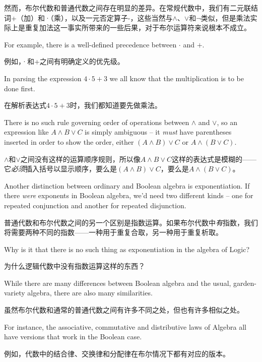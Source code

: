 然而，布尔代数和普通代数之间存在明显的差异。在常规代数中，我们有二元联结词+（加）和·（乘），以及一元否定算子-，这些当然与$\land$、$\lor$和$\lnot$类似，但是乘法实际上是重复加法这一事实所带来的一些后果，对于布尔运算符来说根本不成立。

For example, there is a well-defined precedence between $\cdot$ and
$+$.

例如，·和+之间有明确定义的优先级。

In parsing the expression $4 \cdot 5 + 3$ we all know that the 
multiplication is to be done first.

在解析表达式$4 \cdot 5 + 3$时，我们都知道要先做乘法。

There is no such rule governing
order of operations between $\land$ and $\lor$, so an expression like
$A \land B \lor C$ is simply ambiguous -- it {\em must} have parentheses
inserted in order to show the order, either  $(A \land B) \lor C$ or 
$A \land (B \lor C)$.

$\land$和$\lor$之间没有这样的运算顺序规则，所以像$A \land B \lor C$这样的表达式是模糊的——它{\em 必须}插入括号以显示顺序，要么是$(A \land B) \lor C$，要么是$A \land (B \lor C)$。

Another distinction between ordinary and Boolean
algebra is exponentiation.  If there {\em were} exponents in Boolean algebra,
we'd need two different kinds -- one for repeated conjunction and another
for repeated disjunction.

普通代数和布尔代数之间的另一个区别是指数运算。如果布尔代数中{\em 有}指数，我们将需要两种不同的指数——一种用于重复合取，另一种用于重复析取。

\begin{exer} 
Why is it that there is no such thing as exponentiation
in the algebra of Logic?

为什么逻辑代数中没有指数运算这样的东西？
\end{exer}

While there are many differences between Boolean algebra and the
usual, garden-variety algebra, there are also many similarities.

虽然布尔代数和通常的普通代数之间有许多不同之处，但也有许多相似之处。

For instance, the associative, 
commutative and 
distributive laws
of Algebra all have versions that work in the Boolean case.

例如，代数中的结合律、交换律和分配律在布尔情况下都有对应的版本。

